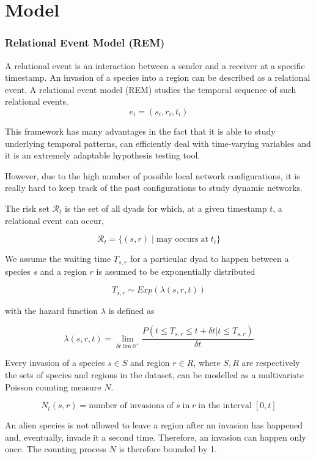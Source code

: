 \documentclass[
	11pt, %
]{beamer}
\begin{document}
\section{Model}
\begin{frame}
	\frametitle{Relational Event Model (REM)}
	
%	
	
	A relational event is an interaction between a sender and a receiver at a specific timestamp. An invasion of a species into a region can be described as a relational event. A relational event model (REM) studies the temporal sequence of such relational events.
\[
e_i = (s_i, r_i, t_i)
\]	
	
	This framework has many advantages in the fact that it is able to study underlying temporal patterns, can efficiently deal with time-varying variables and it is an extremely adaptable hypothesis testing tool.
	
However, due to the high number of possible local network configurations, it is really hard to keep track of the past configurations to study dynamic networks.
\end{frame}

\begin{frame}
The risk set $\mathcal{R}_t$ is the set of all dyads for which, at a given timestamp $t$, a relational event can occur,

\[
\mathcal{R}_{t} = \{(s,r) \; | \; \textrm{may occurs} \; \textrm{at} \; t_i\}
\]

We assume the waiting time $T_{s,r}$ for a particular dyad to happen between a species $s$ and a region $r$ is assumed to be exponentially distributed 

\[
T_{s,r} \sim Exp(\lambda(s, r, t) )
\]

with the hazard function $\lambda$ is defined as

\[
\lambda(s, r, t) = \lim_{\delta t \lim 0^+} \frac{P(t \leq T_{s,r} \leq t + \delta t | t \leq T_{s,r})}{\delta t}
\]
\end{frame}

\begin{frame}
Every invasion of a species $s \in S$ and region $r \in R$, where $S, R$ are respectively the sets of species and regions in the dataset, can be modelled as a multivariate Poisson counting measure  $N$.

\[
N_t(s, r) = \textrm{number of invasions of} \; s \; \textrm{in} \; r \; \textrm{in the interval} \; [0, t]
\]

An alien species is not allowed to leave a region after an invasion has happened and, eventually, invade it a second time. Therefore, an invasion can happen only once. The counting process $N$ is therefore bounded by 1.
\end{frame}
\end{document}
